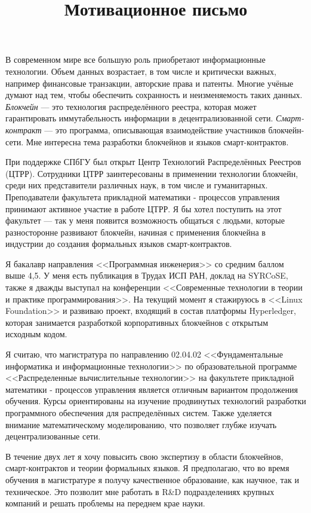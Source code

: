 \documentclass[12pt,a4paper]{article}
\begin{document}
\title{Мотивационное письмо}
\date{}
\author{}
\maketitle
\thispagestyle{empty}
В современном мире все большую роль приобретают информационные технологии.
Объем данных возрастает, в том числе и критически важных, например финансовые транзакции, авторские права и патенты.
Многие учёные думают над тем, чтобы обеспечить сохранность и неизменяемость таких данных.
\emph{Блокчейн} --- это технология распределённого реестра, которая может гарантировать иммутабельность информации в децентрализованной сети.
\emph{Смарт-контракт} --- это программа, описывающая взаимодействие участников блокчейн-сети. 
Мне интересна тема разработки блокчейнов и языков смарт-контрактов.

При поддержке СПбГУ был открыт Центр Технологий Распределённых Реестров (ЦТРР). 
Сотрудники ЦТРР заинтересованы в применении технологии блокчейн, среди них представители различных наук, в том числе и гуманитарных.
Преподаватели факультета прикладной математики - процессов управления принимают активное участие в работе ЦТРР.
Я бы хотел поступить на этот факультет --- так у меня появится возможность общаться с людьми, которые разносторонне развивают блокчейн, начиная с применения блокчейна в индустрии до создания формальных языков смарт-контрактов.

Я бакалавр направления <<Программная инженерия>> со средним баллом выше 4,5.
У меня есть публикация в Трудах ИСП РАН, доклад на SYRCoSE, также я дважды выступал на конференции <<Современные технологии в теории и практике программирования>>.
На текущий момент я стажируюсь в <<Linux Foundation>> и развиваю проект, входящий в состав платформы Hyperledger, которая занимается разработкой корпоративных блокчейнов с открытым исходным кодом.

Я считаю, что магистратура по направлению 02.04.02 <<Фундаментальные информатика и информационные технологии>> по образовательной программе <<Распределенные вычислительные технологии>> на факультете прикладной математики - процессов управления является отличным вариантом продолжения обучения.
Курсы ориентированы на изучение продвинутых технологий разработки программного обеспечения для распределённых систем.
Также уделяется внимание математическому моделированию, что позволяет глубже изучать децентрализованные сети.

В течение двух лет я хочу повысить свою экспертизу в области блокчейнов, смарт-кон\-трак\-тов и теории формальных языков.
Я предполагаю, что во время обучения в магистратуре я получу качественное образование, как научное, так и техническое.
Это позволит мне работать в R\&D подразделениях крупных компаний и решать проблемы на переднем крае науки.
\end{document}
